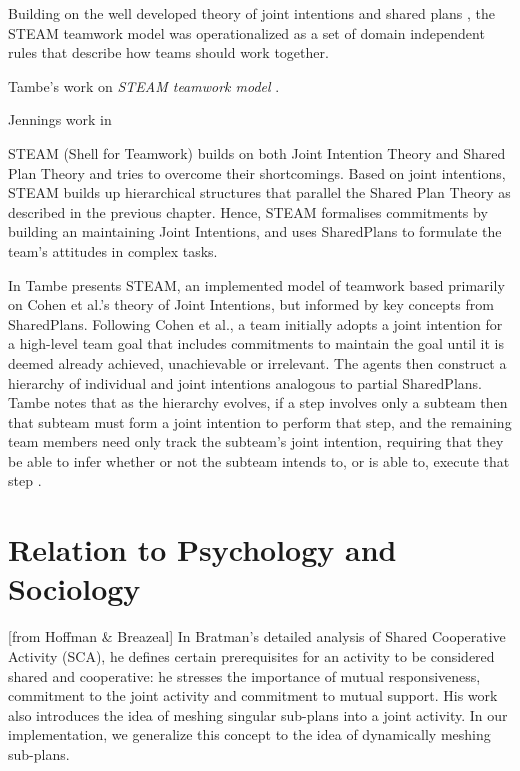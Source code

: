 \documentclass[11pt]{article}
\begin{document}
Building on the well developed theory of joint intentions \cite{cohen:teamwork}
and shared plans \cite{grosz:plans-discourse} \cite{grosz:collaboration}, the
STEAM teamwork model \cite{tambe:flexible-teamwork} was operationalized as a set
of domain independent rules that describe how teams should work together.

Tambe's work on \textit{STEAM teamwork model} \cite{tambe:flexible-teamwork}.

Jennings work in \cite{jennings:joint-intention-hybrid}

STEAM (Shell for Teamwork) builds on both Joint Intention Theory and Shared Plan
Theory and tries to overcome their shortcomings. Based on joint intentions,
STEAM builds up hierarchical structures that parallel the Shared Plan Theory as
described in the previous chapter. Hence, STEAM formalises commitments by
building an  maintaining Joint Intentions, and uses SharedPlans to formulate the
team's attitudes in complex tasks.

In \cite{tambe:flexible-teamwork} Tambe presents STEAM, an implemented model of
teamwork based primarily on Cohen et al.'s theory of Joint Intentions, but
informed by key concepts from SharedPlans. Following Cohen et al., a team
initially adopts a joint intention for a high-level team goal that includes
commitments to maintain the goal until it is deemed already achieved,
unachievable or irrelevant. The agents then construct a hierarchy of individual
and joint intentions analogous to partial SharedPlans. Tambe notes that as the
hierarchy evolves, if a step involves only a subteam then that subteam must form
a joint intention to perform that step, and the remaining team members need only
track the subteam's joint intention, requiring that they be able to infer
whether or not the subteam intends to, or is able to, execute that step
\cite{hunsberger:shared-plans-easier}.

\section{Relation to Psychology and Sociology}

[from Hoffman \& Breazeal] In Bratman’s detailed analysis of Shared Cooperative
Activity (SCA), he defines certain prerequisites for an activity to be
considered shared and cooperative: he stresses the importance of mutual
responsiveness, commitment to the joint activity and commitment to mutual
support. His work also introduces the idea of meshing singular sub-plans into a
joint activity. In our implementation, we generalize this concept to the idea of
dynamically meshing sub-plans.
\end{document}
